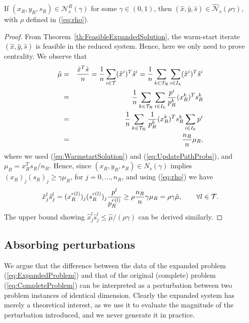 \begin{theorem}  \label{th:NeighbourhoodExpandedSolution}
If $(x_R, y_R, s_R) \in \mathcal{N}^R_s(\gamma)$ 
for some $\gamma\in(0,1)$, then $(\hat{x}, \hat{y}, \hat{s})\in
\widehat{\mathcal{N}}_s(\rho\gamma)$,
with $\rho$ defined in (\ref{eq:rho}).
\end{theorem}
%
\begin{proof}
From Theorem~\ref{th:FeasibleExpandedSolution}, the warm-start iterate 
$(\hat x, \hat y, \hat s)$ is feasible in the reduced system.
Hence, here we only need to prove centrality. 
We observe that 
\begin{eqnarray*}
  \hat{\mu} &=& \frac{\hat{x}^T\hat{s}}{n} 
   = \frac{1}{n}\sum_{i \in \mathcal{T}}(\hat x^i)^T\hat{s}^i 
   = \frac{1}{n}\sum_{k\in \mathcal{T}_\mathcal{R}}\sum_{i\in I_k} (\hat{x}^i)^T\hat{s}^i \\
  &=& \frac{1}{n}\sum_{k\in \mathcal{T}_\mathcal{R}}\sum_{i\in I_k} \frac{p^i}{p_R^k} 
      (x_R^k)^T s_R^k \\
  &=& \frac{1}{n} \sum_{k\in\mathcal{T}_\mathcal{R}} \frac{1}{p_R^k}(x_R^k)^T s_R^k
      \sum_{i\in I_k}p^i\\
  &=& \frac{n_R}{n} \mu_R,
\end{eqnarray*}
where we used (\ref{eq:WarmstartSolution}) and (\ref{eq:UpdatePathProbs}), 
and $\mu_R = x_R^Ts_R/n_R$. 
Hence, since $(x_R, y_R, s_R)\in N_s(\gamma)$ 
implies $(x_R)_j (s_R)_j\ge \gamma\mu_R$, for $j = 0, \ldots, n_R$, 
and using (\ref{eq:rho}) we have
\[
  \hat x^l_j\hat s^l_j = (x_R^{r(l)})_j (s_R^{r(l)})_j
                         \frac{p^l}{p_R^{r(l)}}
                       \ge \rho\frac{n_R}{n} \gamma\mu_R 
                       = \rho\gamma\hat{\mu},
		       \qquad\forall l \in \mathcal{T}.
\]
The upper bound showing $\hat x^l_j\hat s^l_j\le \hat{\mu}/(\rho\gamma)$
can be derived similarly.
\end{proof}

%
%
\subsection{Absorbing perturbations}

We argue that the difference between the data of the expanded 
problem (\ref{eq:ExpandedProblem}) and that of the original (complete) 
problem (\ref{eq:CompleteProblem}) can be interpreted as a perturbation 
between two problem instances of identical dimension. 
Clearly the expanded system has merely a theoretical
interest, as we use it to evaluate the magnitude of the 
perturbation introduced, and we never generate it in practice.


